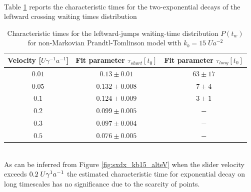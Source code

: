 \\Table \ref{tab:sxdx_left} reports the characteristic times for the two-exponential decays of the leftward crossing waiting times distribution
\begin{table}
\centering 
\begin{tabular}{ccc}
    \toprule
    Velocity [$U \gamma ^{-1} a^{-1}$] & Fit parameter $\tau_{short} [t_0]$ & Fit parameter $\tau_{long} [t_0]$ \\
    \midrule 
    $0.01$ & $0.13 \pm 0.01$ & $63 \pm 17$\\
    $0.05$ & $0.132\pm 0.008$ & $7 \pm 4$\\
    $0.1$ & $0.124 \pm 0.009$ & $3\pm 1$\\
    $0.2$ & $0.099 \pm 0.005$ & $-$\\
    $0.3$ & $0.097 \pm 0.004$ & $-$\\
    $0.5$ & $0.076 \pm 0.005$ & $-$\\
    \bottomrule
\end{tabular}
\caption{Characteristic times for the leftward-jumps waiting-time distribution $P(t_w)$ for non-Markovian Prandtl-Tomlinson model with $k_b=15\; Ua^{-2}$}
\label{tab:sxdx_left}
\end{table}
\\
As can be inferred from Figure \ref{fig:sxdx_kb15_alteV} when the slider velocity exceeds $0.2 \hspace{0.1cm} U\gamma^{1} a^{-1}$ the estimated characteristic time for exponential decay on long timescales has no significance due to the scarcity of points.

\clearpage
